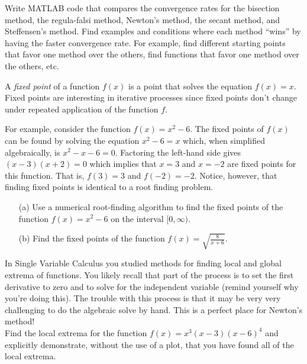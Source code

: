 \begin{problem}
    Write MATLAB code that compares the convergence rates for the bisection method, the
    regula-falsi method, Newton's method, the secant method, and Steffensen's method. Find examples
    and conditions where each method ``wins'' by having the faster convergence rate.  For
    example, find different starting points that favor one method over the others, find
    functions that favor one method over the others, etc.
\end{problem}


\begin{problem}
    A {\it fixed point} of a function $f(x)$ is a point that solves the equation $f(x) =
    x$.  Fixed points are interesting in iterative processes since fixed points don't
    change under repeated application of the function $f$.  

    For example, consider the function $f(x) = x^2 - 6$.  The fixed points of $f(x)$ can be found by
    solving the equation $x^2 - 6 = x$ which, when simplified algebraically, is $x^2 - x -
    6 = 0$.  Factoring the left-hand side gives $(x-3)(x+2)=0$ which implies that $x=3$
    and $x=-2$ are fixed points for this function. That is, $f(3) = 3$ and $f(-2) = -2$.
    Notice, however, that finding fixed points is identical to a root finding problem.
    \begin{enumerate}
        \item[(a)] Use a numerical root-finding algorithm to find the fixed points of the
            function $f(x) = x^2 - 6$ on the interval $[0,\infty)$.
            \item[(b)] Find the fixed points of the function $f(x) =
                \sqrt{\frac{8}{x+6}}$.
    \end{enumerate}
\end{problem}

\begin{problem}
    In Single Variable Calculus you studied methods for finding local and global extrema
    of functions. You likely recall that part of the process is to set the first
    derivative to zero and to solve for the independent variable (remind yourself why
    you're doing this).  The trouble with this process is that it may be very very
    challenging to do the algebraic solve by hand.  This is a perfect place for Newton's
    method! \\
    Find the local extrema for the function $f(x) = x^3(x-3)(x-6)^4$ and explicitly
    demonstrate, without the use of a plot, that you have found all of the local extrema.
\end{problem}


